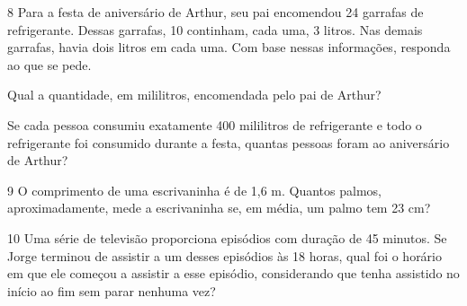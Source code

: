 \begin{mdframed}[linewidth=2pt,linecolor=salmao]
\mbox{}\vspace*{2cm}
\end{mdframed}

\pagebreak

\num{8} Para a festa de aniversário de Arthur, seu pai encomendou 24
garrafas de refrigerante. Dessas garrafas, 10 continham, cada uma, 3
litros. Nas demais garrafas, havia dois litros em cada uma. Com base
nessas informações, responda ao que se pede.

\begin{escolha}
\item
  Qual a quantidade, em mililitros, encomendada pelo pai de Arthur?

\bigskip
\bigskip

\item
  Se cada pessoa consumiu exatamente 400 mililitros de refrigerante e
  todo o refrigerante foi consumido durante a festa, quantas pessoas
  foram ao aniversário de Arthur?

\bigskip
\end{escolha}


\num{9} O comprimento de uma escrivaninha é de 1,6 m. Quantos palmos,
aproximadamente, mede a escrivaninha se, em média, um palmo tem 23 cm?

\bigskip\bigskip\bigskip

\num{10} Uma série de televisão proporciona episódios com duração de 45
minutos. Se Jorge terminou de assistir a um desses episódios às 18 horas, qual
foi o horário em que ele começou a assistir a esse episódio, considerando que tenha assistido
no início ao fim sem parar nenhuma vez?

\begin{mdframed}[linewidth=2pt,linecolor=salmao]
\mbox{}\vspace*{4cm}
\end{mdframed}

\pagebreak

